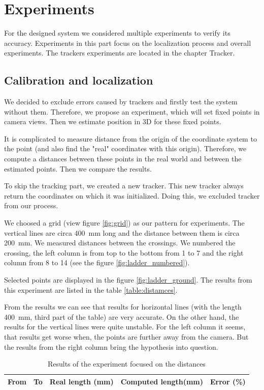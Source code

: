 \chapter{Experiments} 

For the designed system we considered multiple experiments to
verify its accuracy. Experiments in this part focus on the localization process
and overall experiments. The trackers experiments are located in the chapter
Tracker.

\section{Calibration and localization}

We decided to exclude errors caused by trackers and firstly test the system
without them. Therefore, we propose an experiment, which will set fixed points
in camera views. Then we estimate position in 3D for these fixed points.

It is complicated to measure distance from the origin of the coordinate system
to the point (and also find the "real" coordinates with this origin).
Therefore, we compute a distances between these points in the real world and
between the estimated points. Then we compare the results.
 
To skip the tracking part, we created a new tracker. This new tracker always
return the coordinates on which it was initialized. Doing this, we excluded
tracker from our process.

We choosed a grid (view figure \ref{fig:grid}) as our pattern for experiments.
The vertical lines are circa 400~mm long and the distance between them is circa
200~mm. We measured distances between the crossings. We numbered the crossing,
the left column is from top to the bottom from 1 to 7 and the right column from
8 to 14 (see the figure \ref{fig:ladder_numbered}).

Selected points are displayed in the figure \ref{fig:ladder_ground}. The
results from this experiment are listed in the table \ref{table:distamces}. 

From the results we can see that results for horizontal lines (with the length
400~mm, third part of the table) are very accurate. On the other hand, the
results for the vertical lines were quite unstable. For the left column it
seems, that results get worse when, the points are further away from the
camera. But the results from the right column bring the hypothesis into
question. 


\begin{table}
\centering
\begin{tabular}{|r|r|r|r|r|}
\hline
From	& To	& Real length (mm) & Computed length(mm) & Error (\%) \\
\hline
\hline

\hline
\end{tabular}
\label{table:distances}
\caption{Results of the experiment focused on the distances}
\end{table}

